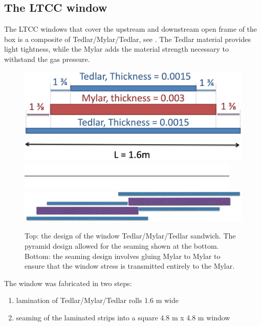\subsection{The LTCC window}

The LTCC windows that cover the upstream and downstream open frame of the box is a composite of Tedlar/Mylar/Tedlar, see . The Tedlar
material provides light tightness, while the Mylar adds the material strength necessary to withstand the gas pressure.

\begin{figure}
	\centering
	\includegraphics[width=1.0\columnwidth, keepaspectratio]{img/windowDesign.png}
	\includegraphics[width=1.0\columnwidth, keepaspectratio]{img/blank.png}
	\includegraphics[width=1.0\columnwidth, keepaspectratio]{img/windowSeaming.png}
	\caption{Top: the design of the window Tedlar/Mylar/Tedlar sandwich. The pyramid design allowed for the seaming shown at the bottom.
			 Bottom: the seaming design involves gluing Mylar to Mylar to ensure that the window stress is transmitted entirely to the Mylar. }
	\label{fig:windowDesign}
\end{figure}


The window was fabricated in two steps:

\begin{enumerate}
	\item lamination of Tedlar/Mylar/Tedlar rolls 1.6 m  wide
	\item seaming of the laminated strips into a square 4.8 m x 4.8 m window
\end{enumerate}

